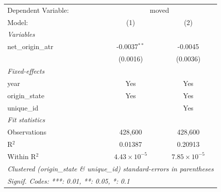 
\begingroup
\centering
\small
\begin{tabular}{lcc}
   \tabularnewline \midrule \midrule
   Dependent Variable: & \multicolumn{2}{c}{moved}\\
   Model:             & (1)                   & (2)\\  
   \midrule
   \emph{Variables}\\
   net\_origin\_atr   & -0.0037$^{**}$        & -0.0045\\   
                      & (0.0016)              & (0.0036)\\   
   \midrule
   \emph{Fixed-effects}\\
   year               & Yes                   & Yes\\  
   origin\_state      & Yes                   & Yes\\  
   unique\_id         &                       & Yes\\  
   \midrule
   \emph{Fit statistics}\\
   Observations       & 428,600               & 428,600\\  
   R$^2$              & 0.01387               & 0.20913\\  
   Within R$^2$       & $4.43\times 10^{-5}$  & $7.85\times 10^{-5}$\\   
   \midrule \midrule
   \multicolumn{3}{l}{\emph{Clustered (origin\_state \& unique\_id) standard-errors in parentheses}}\\
   \multicolumn{3}{l}{\emph{Signif. Codes: ***: 0.01, **: 0.05, *: 0.1}}\\
\end{tabular}
\par\endgroup


